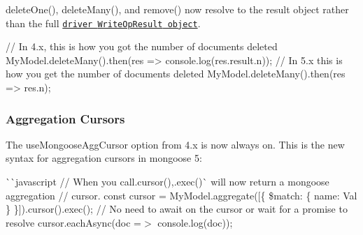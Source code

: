 {\ttfamily delete\+One()}, {\ttfamily delete\+Many()}, and {\ttfamily remove()} now resolve to the result object rather than the full \href{http://mongodb.github.io/node-mongodb-native/2.2/api/Collection.html#~writeOpCallback}{\tt driver {\ttfamily Write\+Op\+Result} object}.


\begin{DoxyCode}
// In 4.x, this is how you got the number of documents deleted
MyModel.deleteMany().then(res => console.log(res.result.n));
// In 5.x this is how you get the number of documents deleted
MyModel.deleteMany().then(res => res.n);
\end{DoxyCode}


\subsubsection*{Aggregation Cursors}

The {\ttfamily use\+Mongoose\+Agg\+Cursor} option from 4.\+x is now always on. This is the new syntax for aggregation cursors in mongoose 5\+:

\`{}\`{}{\ttfamily javascript // When you call}.cursor(){\ttfamily ,}.exec()\`{} will now return a mongoose aggregation // cursor. const cursor = My\+Model.\+aggregate(\mbox{[}\{ \$match\+: \{ name\+: \textquotesingle{}Val\textquotesingle{} \} \}\mbox{]}).cursor().exec(); // No need to {\ttfamily await} on the cursor or wait for a promise to resolve cursor.\+each\+Async(doc =$>$ console.\+log(doc));

